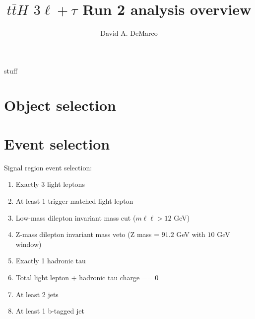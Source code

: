 \documentclass[11pt]{article}
\author{David A. DeMarco}
\title{$t\bar{t}H$ $3\ell+\tau$ Run 2 analysis overview}
\begin{document}
	\maketitle
	\begin{center}
		stuff 
	\end{center}	 
	\clearpage 
	
	\section{Object selection} 
	
	\clearpage
	\section{Event selection} 
		Signal region event selection:
		\begin{enumerate}
			\item Exactly 3 light leptons
			\item At least 1 trigger-matched light lepton 
			\item Low-mass dilepton invariant mass cut ($m\ell\ell>12$ GeV) 
			\item Z-mass dilepton invariant mass veto (Z mass = $91.2$ GeV with $10$ GeV window) 
			\item Exactly 1 hadronic tau 
			\item Total light lepton + hadronic tau charge == 0 
			\item At least 2 jets
			\item At least 1 b-tagged jet
		\end{enumerate} 
	\clearpage
\end{document}
